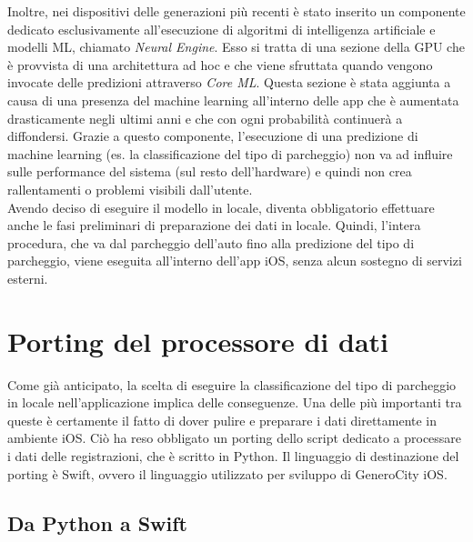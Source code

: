 Inoltre, nei dispositivi delle generazioni più recenti è stato inserito
un componente dedicato esclusivamente all'esecuzione di algoritmi di
intelligenza artificiale e modelli ML, chiamato \emph{Neural Engine}.
Esso si tratta di una sezione della GPU che è provvista di una 
architettura ad hoc e che viene sfruttata quando vengono invocate delle
predizioni attraverso \emph{Core ML}. Questa sezione è stata aggiunta 
a causa di una presenza del machine learning all'interno delle app
che è aumentata drasticamente negli ultimi anni e che con ogni
probabilità continuerà a diffondersi. Grazie a questo componente,
l'esecuzione di una predizione di machine learning (es. la 
classificazione del tipo di parcheggio) non va ad influire sulle
performance del sistema (sul resto dell'hardware) e quindi non 
crea rallentamenti o problemi visibili dall'utente.\\
Avendo deciso di eseguire il modello in locale, diventa obbligatorio
effettuare anche le fasi preliminari di preparazione dei dati in 
locale. Quindi, l'intera procedura, che va dal parcheggio 
dell'auto fino alla predizione del tipo di parcheggio, viene
eseguita all'interno dell'app iOS, senza alcun sostegno di 
servizi esterni.

\section{Porting del processore di dati}

Come già anticipato, la scelta di eseguire la classificazione del tipo di
parcheggio in locale nell'applicazione implica delle conseguenze.
Una delle più importanti tra queste è certamente il fatto di dover
pulire e preparare i dati direttamente in ambiente iOS. Ciò
ha reso obbligato un porting dello script dedicato a processare i
dati delle registrazioni, che è scritto in Python. Il linguaggio di 
destinazione del porting è Swift, ovvero il linguaggio utilizzato
per sviluppo di GeneroCity iOS.

\subsection{Da Python a Swift}

